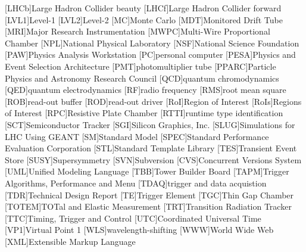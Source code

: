 \begin{acronym}[HLTSSW]
[LHCb]{Large Hadron Collider beauty\protect{}}
[LHCf]{Large Hadron Collider forward\protect{}}
[LVL1]{Level-1\protect{}}
[LVL2]{Level-2\protect{}}
[MC]{Monte Carlo\protect{}}
[MDT]{Monitored Drift Tube\protect{}}
[MRI]{Major Research Instrumentation\protect{}}
[MWPC]{Multi-Wire Proportional Chamber\protect{}}
[NPL]{National Physical Laboratory\protect{}}
[NSF]{National Science Foundation\protect{}}
[PAW]{Physics Analysis Workstation\protect{}}
[PC]{personal computer\protect{}}
[PESA]{Physics and Event Selection Architecture\protect{}}
[PMT]{photomultiplier tube\protect{}}
[PPARC]{Particle Physics and Astronomy Research Council\protect{}}
[QCD]{quantum chromodynamics\protect{}}
[QED]{quantum electrodynamics\protect{}}
[RF]{radio frequency\protect{}}
[RMS]{root mean square\protect{}}
[ROB]{read-out buffer\protect{}}
[ROD]{read-out driver\protect{}}
[RoI]{Region of Interest\protect{}}
[RoIs]{Regions of Interest\protect{}}
[RPC]{Resistive Plate Chamber\protect{}}
[RTTI]{runtime type identification\protect{}}
[SCT]{Semiconductor Tracker\protect{}}
[SGI]{Silicon Graphics, Inc.\protect{}}
[SLUG]{Simulations for LHC Using GEANT\protect{}}
[SM]{Standard Model\protect{}}
[SPEC]{Standard Performance Evaluation Corporation\protect{}}
[STL]{Standard Template Library\protect{}}
[TES]{Transient Event Store\protect{}}
[SUSY]{Supersymmetry\protect{}}
[SVN]{Subversion\protect{}}
[CVS]{Concurrent Versions System\protect{}}
[UML]{Unified Modeling Language\protect{}}
[TBB]{Tower Builder Board\protect{}}
[TAPM]{Trigger Algorithms, Performance and Menu\protect{}}
[TDAQ]{trigger and data acquistion\protect{}}
[TDR]{Technical Design Report\protect{}}
[TE]{Trigger Element\protect{}}
[TGC]{Thin Gap Chamber\protect{}}
[TOTEM]{TOTal and Elastic Measurement\protect{}}
[TRT]{Transition Radiation Tracker\protect{}}
[TTC]{Timing, Trigger and Control\protect{}}
[UTC]{Coordinated Universal Time\protect{}}
[VP1]{Virtual Point 1\protect{}}
[WLS]{wavelength-shifting\protect{}}
[WWW]{World Wide Web\protect{}}
[XML]{Extensible Markup Language\protect{}}

\end{acronym}
